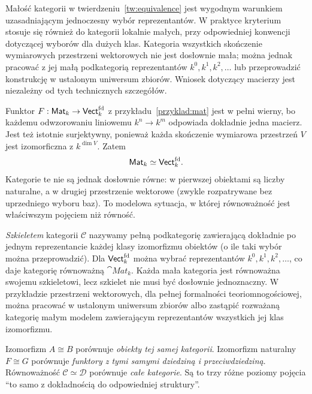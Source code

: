\begin{uwaga}
Małość kategorii w twierdzeniu~\ref{tw:equivalence} jest wygodnym warunkiem uzasadniającym jednoczesny wybór reprezentantów. W praktyce kryterium stosuje się również do kategorii lokalnie małych, przy odpowiedniej konwencji dotyczącej wyborów dla dużych klas. Kategoria wszystkich skończenie wymiarowych przestrzeni wektorowych nie jest dosłownie mała; można jednak pracować z jej małą podkategorią reprezentantów $k^0,k^1,k^2,\ldots$ lub przeprowadzić konstrukcję w ustalonym uniwersum zbiorów. Wniosek dotyczący macierzy jest niezależny od tych technicznych szczegółów.
\end{uwaga}


\begin{przyklad}\label{przyklad:mat-equivalence}
Funktor $F:\mathsf{Mat}_k\to\mathsf{Vect}_k^{\mathrm{fd}}$ z przykładu~\ref{przyklad:mat} jest w pełni wierny, bo każdemu odwzorowaniu liniowemu $k^n\to k^m$ odpowiada dokładnie jedna macierz. Jest też istotnie surjektywny, ponieważ każda skończenie wymiarowa przestrzeń $V$ jest izomorficzna z $k^{\dim V}$. Zatem
\[
\mathsf{Mat}_k\simeq\mathsf{Vect}_k^{\mathrm{fd}}.
\]
Kategorie te nie są jednak dosłownie równe: w pierwszej obiektami są liczby naturalne, a w drugiej przestrzenie wektorowe (zwykle rozpatrywane bez uprzedniego wyboru baz). To modelowa sytuacja, w której równoważność jest właściwszym pojęciem niż równość.
\end{przyklad}

\begin{przyklad}
\emph{Szkieletem} kategorii $\mathcal C$ nazywamy pełną podkategorię zawierającą dokładnie po jednym reprezentancie każdej klasy izomorfizmu obiektów (o ile taki wybór można przeprowadzić). Dla $\mathsf{Vect}_k^{\mathrm{fd}}$ można wybrać reprezentantów $k^0,k^1,k^2,\ldots$, co daje kategorię równoważną $\cat{Mat}_k$. Każda mała kategoria jest równoważna swojemu szkieletowi, lecz szkielet nie musi być dosłownie jednoznaczny. W przykładzie przestrzeni wektorowych, dla pełnej formalności teoriomnogościowej, można pracować w ustalonym uniwersum zbiorów albo zastąpić rozważaną kategorię małym modelem zawierającym reprezentantów wszystkich jej klas izomorfizmu.
\end{przyklad}

\begin{uwaga}
Izomorfizm $A\cong B$ porównuje \emph{obiekty tej samej kategorii}. Izomorfizm naturalny $F\cong G$ porównuje \emph{funktory z tymi samymi dziedziną i przeciwdziedziną}. Równoważność $\mathcal C\simeq\mathcal D$ porównuje \emph{całe kategorie}. Są to trzy różne poziomy pojęcia ``to samo z dokładnością do odpowiedniej struktury''.
\end{uwaga}

